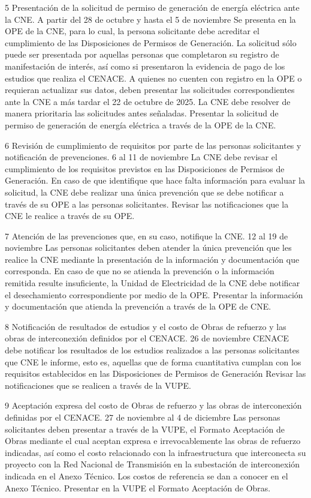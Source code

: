  5
 Presentación de la solicitud de permiso de generación de energía eléctrica ante la CNE.
 A partir del 28 de octubre y hasta el 5 de noviembre
 Se presenta en la OPE de la CNE, para lo cual, la persona solicitante debe acreditar el cumplimiento de las Disposiciones de Permisos de Generación.
La solicitud sólo puede ser presentada por aquellas personas que completaron su registro de manifestación de interés, así como si presentaron la evidencia de pago de los estudios que realiza el CENACE.
A quienes no cuenten con registro en la OPE o requieran actualizar sus datos, deben presentar las solicitudes correspondientes ante la CNE a más tardar el 22 de octubre de 2025.
La CNE debe resolver de manera prioritaria las solicitudes antes señaladas.
 Presentar la solicitud de permiso de generación de energía eléctrica a través de la OPE de la CNE.
 
 6
 Revisión de cumplimiento de requisitos por parte de las personas solicitantes y notificación de prevenciones.
 6 al 11 de noviembre
 La CNE debe revisar el cumplimiento de los requisitos previstos en las Disposiciones de Permisos de Generación.
En caso de que identifique que hace falta información para evaluar la solicitud, la CNE debe realizar una única prevención que se debe notificar a través de su OPE a las personas solicitantes.
 Revisar las notificaciones que la CNE le realice a través de su OPE.
 
 7
 Atención de las prevenciones que, en su caso, notifique la CNE.
 12 al 19 de noviembre
 Las personas solicitantes deben atender la única prevención que les realice la CNE mediante la presentación de la información y documentación que corresponda.
En caso de que no se atienda la prevención o la información remitida resulte insuficiente, la Unidad de Electricidad de la CNE debe notificar el desechamiento correspondiente por medio de la OPE.
 Presentar la información y documentación que atienda la prevención a través de la OPE de CNE.
 
 8
 Notificación de resultados de estudios y el costo de Obras de refuerzo y las obras de interconexión definidos por el CENACE.
 26 de noviembre
 CENACE debe notificar los resultados de los estudios realizados a las personas solicitantes que CNE le informe, esto es, aquellas que de forma cuantitativa cumplan con los requisitos establecidos en las Disposiciones de Permisos de Generación
 Revisar las notificaciones que se realicen a través de la VUPE.
 
 9
 Aceptación expresa del costo de Obras de refuerzo y las obras de interconexión definidas por el CENACE.
 27 de noviembre al 4 de diciembre
 Las personas solicitantes deben presentar a través de la VUPE, el Formato Aceptación de Obras mediante el cual aceptan expresa e irrevocablemente las obras de refuerzo indicadas, así como el costo relacionado con la infraestructura que interconecta su proyecto con la Red Nacional de Transmisión en la subestación de interconexión indicada en el Anexo Técnico.
Los costos de referencia se dan a conocer en el Anexo Técnico.
 Presentar en la VUPE el Formato Aceptación de Obras.
 
